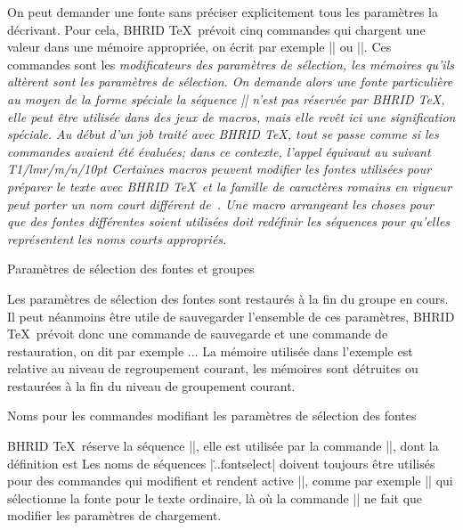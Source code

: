 On peut demander une fonte sans préciser explicitement tous les
paramètres la décrivant. Pour cela, BHRID \TeX\ prévoit cinq commandes
\begincode
\fontpage
\fontfamily
\fontseries
\fontshape
\fontsize
\endcode
qui chargent une valeur dans une mémoire appropriée, on écrit par
exemple || ou ||. Ces commandes sont les
\em{modificateurs des paramètres de sélection}, les mémoires qu'ils
altèrent sont les \em{paramètres de sélection}. On demande alors une
fonte particulière au moyen de la forme spéciale
\begincode
\fontwish\selection\as\tenrm
\endcode
la séquence |\selection| n'est pas réservée par BHRID \TeX, elle peut
être utilisée dans des jeux de macros, mais elle revêt ici une
signification spéciale. Au début d'un \em{job} traité avec BHRID \TeX,
tout se passe comme si les commandes
\begincode
{}
\fontsize{10pt}
\endcode
avaient été évaluées; dans ce contexte, l'appel
\begincode
\fontwish\selection\as\tenrm
\endcode
équivaut au suivant
\begincode
\fontwish T1/lmr/m/n/10pt \as\tenrm
\endcode
Certaines macros peuvent modifier les fontes utilisées pour préparer
le texte avec BHRID \TeX\ et la famille de caractères romains en
vigueur peut porter un nom court différent de~. Une macro
arrangeant les choses pour que des fontes différentes soient utilisées
doit redéfinir les séquences
\begincode
\fontrmfamily
\fontsffamily
\fontttfamily
\endcode
pour qu'elles représentent les noms courts appropriés.

\formalpar Paramètres de sélection des fontes et groupes

Les paramètres de sélection des fontes sont restaurés à la fin du
groupe en cours. Il peut néanmoins être utile de sauvegarder
l'ensemble de ces paramètres, BHRID \TeX\ prévoit donc une commande de
sauvegarde et une commande de restauration, on dit par exemple
\begincode
\fontselectionsave\myselection
...
\fontselectionload\myselection
\endcode
La mémoire utilisée dans l'exemple est relative au niveau de
regroupement courant, les mémoires sont détruites ou restaurées à la
fin du niveau de groupement courant.


\formalpar Noms pour les commandes modifiant les paramètres %
 de sélection des fontes

BHRID \TeX\ réserve la séquence |\fontcurrent|, elle est utilisée par
la commande |\fontselect|, dont la définition est
\begincode
\def\fontselect{\fontwish\selection\as\fontcurrent\fontcurrent}
\endcode
Les noms de séquences |\...fontselect| doivent toujours être utilisés
pour des commandes qui modifient et rendent active |\fontcurrent|,
comme par exemple |\tlfontselect| qui sélectionne la fonte pour le
texte ordinaire, là où la commande |\tlfont| ne fait que modifier les
paramètres de chargement.



